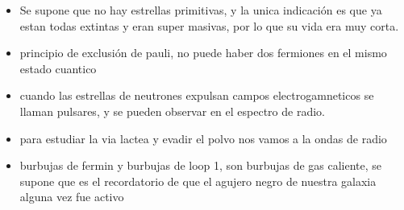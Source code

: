 \documentclass[
  11pt,
  letterpaper,
  answers
]{exam}
\begin{document}
\begin{itemize}
    \item Se supone que no hay estrellas primitivas, y la unica indicación es que ya estan todas extintas y eran super masivas, por lo que su vida era muy corta.
    \item principio de exclusión de pauli, no puede haber dos fermiones en el mismo estado cuantico
    \item cuando las estrellas de neutrones expulsan campos electrogamneticos se llaman pulsares, y se pueden observar en el espectro de radio.
    \item para estudiar la via lactea y evadir el polvo nos vamos a la ondas de radio
    \item burbujas de fermin y burbujas de loop 1, son burbujas de gas caliente, se supone que es el recordatorio de que el agujero negro de nuestra galaxia alguna vez fue activo 
\end{itemize}
\end{document}
